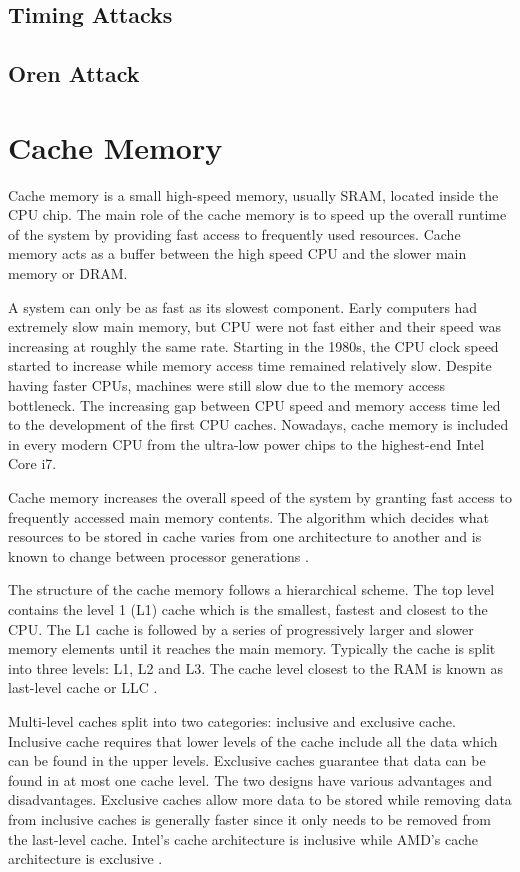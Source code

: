\documentclass[10pt,a4paper,twoside]{book}
\begin{document}
\subsection{Timing Attacks}

\subsection{Oren Attack}

\section{Cache Memory}

Cache memory is a small high-speed memory, usually SRAM, located inside the CPU chip. The main role of the cache memory is to speed up the overall runtime of the system by providing fast access to frequently used resources. Cache memory acts as a buffer between the high speed CPU and the slower main memory or DRAM.

A system can only be as fast as its slowest component. Early computers had extremely slow main memory, but CPU were not fast either and their speed was increasing at roughly the same rate. Starting in the 1980s, the CPU clock speed started to increase while memory access time remained relatively slow. Despite having faster CPUs, machines were still slow due to the memory access bottleneck. The increasing gap between CPU speed and memory access time led to the development of the first CPU caches. Nowadays, cache memory is included in every modern CPU from the ultra-low power chips to the highest-end Intel Core i7.

Cache memory increases the overall speed of the system by granting fast access to frequently accessed main memory contents. The algorithm which decides what resources to be stored in cache varies from one architecture to another and is known to change between processor generations \cite{oren2015spy}. 

The structure of the cache memory follows a hierarchical scheme. The top level contains the level 1 (L1) cache which is the smallest, fastest and closest to the CPU. The L1 cache is followed by a series of progressively larger and slower memory elements until it reaches the main memory. Typically the cache is split into three levels: L1, L2 and L3. The cache level closest to the RAM is known as last-level cache or LLC \cite{oren2015spy}.

Multi-level caches split into two categories: inclusive and exclusive cache. Inclusive cache requires that lower levels of the cache include all the data which can be found in the upper levels. Exclusive caches guarantee that data can be found in at most one cache level. The two designs have various advantages and disadvantages. Exclusive caches allow more data to be stored while removing data from inclusive caches is generally faster since it only needs to be removed from the last-level cache. Intel's cache architecture is inclusive while AMD's cache architecture is exclusive \cite{oren2015spy}.
\end{document}
